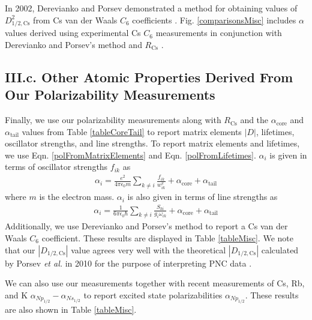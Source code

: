 \documentclass[twocolumn,prl,showpacs,superscriptaddress]{revtex4-1}   %
\newcommand{\figref}[1]{Fig. \ref{#1}}
\newcommand{\eqnref}[1]{Eqn. \eqref{#1}}
\newcommand{\acore}{\alpha_{\textrm{core}}}
\newcommand{\atail}{\alpha_{\textrm{tail}}}
\newcommand{\rcs}{R_{\mathrm{Cs}}}
\newcommand{\etalspace}{\textit{et al. }}
\begin{document}
In 2002, Derevianko and Porsev demonstrated a method for obtaining values of $D_{1/2,\mathrm{Cs}}^2$ from Cs van der Waals $C_6$ coefficients \cite{Derevianko2001}. \figref{comparisonsMisc} includes $\alpha$ values derived using experimental Cs $C_6$ measurements in conjunction with Derevianko and Porsev's method and $\rcs$ \cite{Leo2000,Chin2004,Derevianko2001,Rafac1998}.

\subsection{III.c. Other Atomic Properties Derived From Our Polarizability Measurements}

Finally, we use our polarizability measurements along with $\rcs$ and the $\acore$ and $\atail$ values from Table \ref{tableCoreTail} to report matrix elements $|D|$, lifetimes, oscillator strengths, and line strengths. To report matrix elements and lifetimes, we use \eqnref{polFromMatrixElements} and \eqnref{polFromLifetimes}. $\alpha_i$ is given in terms of oscillator strengths $f_{ik}$ as 
\begin{align}
	\alpha_i = \frac{e^2}{4 \pi \epsilon_0 m}
	\sum_{k \neq i}
	\frac{f_{ik}}{w_{ik}^2}
	+ \acore
	+ \atail
	\label{polFromOscStr}
\end{align}
where $m$ is the electron mass. 
$\alpha_i$ is also given in terms of line strengths as
\begin{align}
	\alpha_i = \frac{1}{6\pi\epsilon_0\hbar} 
	\sum_{k \neq i} 
	\frac{S_{ki}}{g_i\omega_{ik}}
	+ \acore
	+ \atail
	\label{polFromLineStr}
\end{align}
Additionally, we use Derevianko and Porsev's method to report a Cs van der Waals $C_6$ coefficient. These results are displayed in Table \ref{tableMisc}. We note that our $\left|D_{1/2,\mathrm{Cs}}\right|$ value agrees very well with the theoretical $\left|D_{1/2,\mathrm{Cs}}\right|$ calculated by Porsev \etalspace in 2010 for the purpose of interpreting PNC data \cite{Porsev2010}.

We can also use our measurements together with recent measurements of Cs, Rb, and K $\alpha_{Np_{1/2}} - \alpha_{Ns_{1/2}}$ \cite{Hunter1991,Miller1994} to report excited state polarizabilities $\alpha_{Np_{1/2}}$. 
These results are also shown in Table \ref{tableMisc}.
\end{document}
